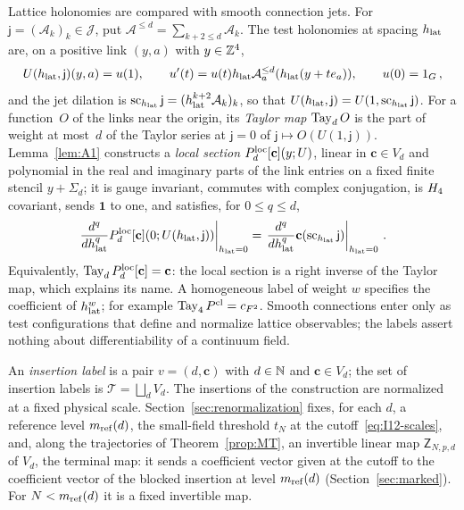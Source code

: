 Lattice holonomies are compared with smooth connection jets. For $\mathsf j=(\mathcal A_k)_k\in\mathcal J$, put $\mathcal A^{\le d}=\sum_{k+2\le d}\mathcal A_k$. The test holonomies at spacing $h_{\rm lat}$ are, on a positive link $(y,a)$ with $y\in\mathbb{Z}^4$,
\begin{equation}\label{eq:I12-test-holonomy}
U(h_{\rm lat},\mathsf j)(y,a)=u(1),\qquad
u'(t)=u(t)h_{\rm lat}\mathcal A_a^{\le d}(h_{\rm lat}(y+te_a)),\qquad u(0)=1_G\,,
\end{equation}
and the jet dilation is $\operatorname{sc}_{h_{\rm lat}}\mathsf j=(h_{\rm lat}^{k+2}\mathcal A_k)_k$, so that $U(h_{\rm lat},\mathsf j)=U(1,\operatorname{sc}_{h_{\rm lat}}\mathsf j)$. For a function~$O$ of the links near the origin, its \emph{Taylor map} $\operatorname{Tay}_dO$ is the part of weight at most~$d$ of the Taylor series at $\mathsf j=0$ of $\mathsf j\mapsto O(U(1,\mathsf j))$. Lemma~\ref{lem:A1} constructs a \emph{local section} $P_{d}^{\mathrm{loc}}[\mathbf c](y;U)$, linear in $\mathbf c\in V_d$ and polynomial in the real and imaginary parts of the link entries on a fixed finite stencil $y+\Sigma_d$; it is gauge invariant, commutes with complex conjugation, is $H_4$ covariant, sends $\mathbf1$ to one, and satisfies, for $0\le q\le d$,
\begin{equation}\label{eq:I12-section-Taylor}
\left.\frac{d^q}{dh_{\rm lat}^q}P_{d}^{\mathrm{loc}}[\mathbf c](0;U(h_{\rm lat},\mathsf j))\right|_{h_{\rm lat}=0}
=\left.\frac{d^q}{dh_{\rm lat}^q}\mathbf c(\operatorname{sc}_{h_{\rm lat}}\mathsf j)\right|_{h_{\rm lat}=0}\,.
\end{equation}
Equivalently, $\operatorname{Tay}_dP_{d}^{\mathrm{loc}}[\mathbf c]=\mathbf c$: the local section is a right inverse of the Taylor map, which explains its name. A homogeneous label of weight $w$ specifies the coefficient of $h_{\rm lat}^w$; for example $\operatorname{Tay}_4P^{\rm cl}=c_{F^2}$. Smooth connections enter only as test configurations that define and normalize lattice observables; the labels assert nothing about differentiability of a continuum field.

An \emph{insertion label} is a pair $v=(d,\mathbf c)$ with $d\in\mathbb{N}$ and $\mathbf c\in V_d$; the set of insertion labels is $\mathcal T=\bigsqcup_dV_d$. The insertions of the construction are normalized at a fixed physical scale. Section~\ref{sec:renormalization} fixes, for each $d$, a reference level $m_{\mathrm{ref}}(d)$, the small-field threshold $t_N$ at the cutoff~\eqref{eq:I12-scales}, and, along the trajectories of Theorem~\ref{prop:MT}, an invertible linear map $\mathsf Z_{N,p,d}$ of $V_d$, the terminal map: it sends a coefficient vector given at the cutoff to the coefficient vector of the blocked insertion at level $m_{\mathrm{ref}}(d)$ (Section~\ref{sec:marked}). For $N<m_{\mathrm{ref}}(d)$ it is a fixed invertible map.

